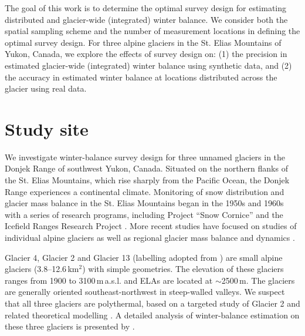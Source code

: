 \documentclass[twocolumn,letterpaper]{igs}
\begin{document}

The goal of this work is to determine the optimal survey design for estimating  distributed and glacier-wide (integrated) winter balance. We consider both the spatial sampling scheme and the number of measurement locations in defining the optimal survey design. For three alpine glaciers in the St. Elias Mountains of Yukon, Canada, we explore the effects of survey design  on: 
(1) the precision in estimated glacier-wide (integrated) winter balance using synthetic data, and  
(2) the accuracy in estimated winter balance at locations distributed across the glacier using real data. 




\section{Study site}

We investigate winter-balance survey design for three unnamed glaciers in the Donjek Range of southwest Yukon, Canada. Situated on the northern flanks of the St. Elias Mountains, which rise sharply from the Pacific Ocean, the Donjek Range experiences a continental climate. Monitoring of snow distribution and glacier mass balance in the St. Elias Mountains began in the 1950s and 1960s with a series of research programs, including Project ``Snow Cornice''  and the Icefield Ranges Research Project \citep{Wood1948, Danby2003}. More recent studies have focused on studies of individual alpine glaciers \citep[e.g.][]{Clarke2014,Flowers2014} as well as regional glacier mass balance and dynamics \citep[e.g.][]{Arendt2008, Burgess2013,Waechter2015}. 

Glacier 4, Glacier 2 and Glacier 13 (labelling adopted from \cite{Crompton2016}) are small alpine glaciers (3.8--12.6\,km$^2$) with simple geometries. The elevation of these glaciers ranges from 1900 to 3100\,m\,a.s.l. and ELAs are located at $\sim$2500\,m. The glaciers are generally oriented southeast-northwest in steep-walled valleys. We suspect that all three glaciers are polythermal, based on a targeted study of Glacier 2 \citep{Wilson2013} and related theoretical modelling \citep{Wilson2013a}. A detailed analysis of winter-balance estimation on these three glaciers is presented by \cite{Pulwicki2017}.
\end{document}
